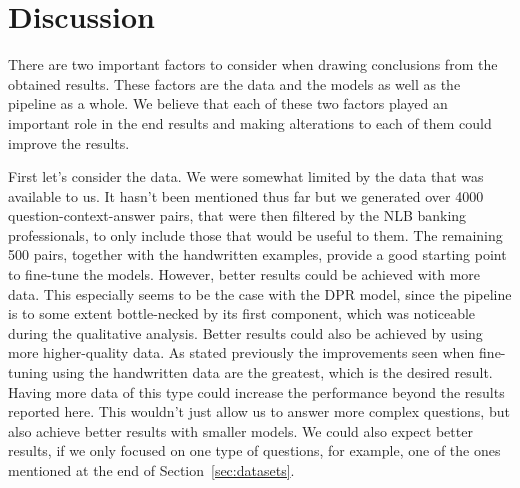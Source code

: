 \documentclass[fleqn,moreauthors,10pt]{ds_report}
\begin{document}
\section*{Discussion}

\noindent There are two important factors to consider when drawing conclusions from the obtained results. These factors are the data and the models as well as the pipeline as a whole. We believe that each of these two factors played an important role in the end results and making alterations to each of them could improve the results.

\noindent First let's consider the data. We were somewhat limited by the data that was available to us. It hasn't been mentioned thus far but we generated over 4000 question-context-answer pairs, that were then filtered by the NLB banking professionals, to only include those that would be useful to them. The remaining 500 pairs, together with the handwritten examples, provide a good starting point to fine-tune the models. However, better results could be achieved with more data. This especially seems to be the case with the DPR model, since the pipeline is to some extent bottle-necked by its first component, which was noticeable during the qualitative analysis. Better results could also be achieved by using more higher-quality data. As stated previously the improvements seen when fine-tuning using the handwritten data are the greatest, which is the desired result. Having more data of this type could increase the performance beyond the results reported here. This wouldn't just allow us to answer more complex questions, but also achieve better results with smaller models. We could also expect better results, if we only focused on one type of questions, for example, one of the ones mentioned at the end of Section~\ref{sec:datasets}.
\end{document}
